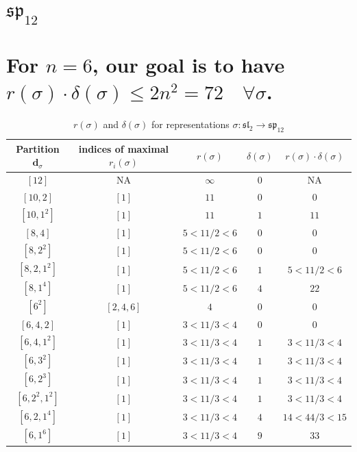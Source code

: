 \documentclass{article}%
\begin{document}
%
\section{$\mathfrak{sp}_{12}$}%
\section*{For $n=6$, our goal is to have $r(\sigma) \cdot \delta(\sigma) \leq 2n^2 = 72 \quad \forall \sigma$.}%

%
\linebreak%

    \begin{center}
    \label{table:sp_12}
    \begin{longtable}{||c|c|c|c|c||}
    \caption{$r(\sigma)$ and $\delta(\sigma)$ for representations $\sigma: \mathfrak{sl}_2 \to \mathfrak{sp}_{12}$}
    \hline
    Partition $\textbf{d}_\sigma$
    &indices of maximal $r_i(\sigma)$
    &$r(\sigma)$
    &$\delta(\sigma)$
    &$r(\sigma) \cdot \delta(\sigma)$
    \\ [0.3ex] \hline\endhead
    $[12]$ & NA & $\infty$ & $0$ & NA \\ \hline 
$[10, 2]$ & $[1]$ & $11$ & $0$ & $0$ \\ \hline 
$[10, 1^{2}]$ & $[1]$ & $11$ & $1$ & $11$ \\ \hline 
$[8, 4]$ & $[1]$ & $5 < 11/2 < 6$ & $0$ & $0$ \\ \hline 
$[8, 2^{2}]$ & $[1]$ & $5 < 11/2 < 6$ & $0$ & $0$ \\ \hline 
$[8, 2, 1^{2}]$ & $[1]$ & $5 < 11/2 < 6$ & $1$ & $5 < 11/2 < 6$ \\ \hline 
$[8, 1^{4}]$ & $[1]$ & $5 < 11/2 < 6$ & $4$ & $22$ \\ \hline 
$[6^{2}]$ & $[2, 4, 6]$ & $4$ & $0$ & $0$ \\ \hline 
$[6, 4, 2]$ & $[1]$ & $3 < 11/3 < 4$ & $0$ & $0$ \\ \hline 
$[6, 4, 1^{2}]$ & $[1]$ & $3 < 11/3 < 4$ & $1$ & $3 < 11/3 < 4$ \\ \hline 
$[6, 3^{2}]$ & $[1]$ & $3 < 11/3 < 4$ & $1$ & $3 < 11/3 < 4$ \\ \hline 
$[6, 2^{3}]$ & $[1]$ & $3 < 11/3 < 4$ & $1$ & $3 < 11/3 < 4$ \\ \hline 
$[6, 2^{2}, 1^{2}]$ & $[1]$ & $3 < 11/3 < 4$ & $1$ & $3 < 11/3 < 4$ \\ \hline 
$[6, 2, 1^{4}]$ & $[1]$ & $3 < 11/3 < 4$ & $4$ & $14 < 44/3 < 15$ \\ \hline 
$[6, 1^{6}]$ & $[1]$ & $3 < 11/3 < 4$ & $9$ & $33$ \\ \hline 

\end{longtable}
\end{center}
\end{document}
